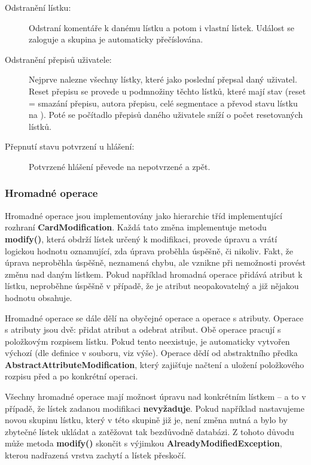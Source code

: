 \begin{description}
\item[Odstranění lístku:]{Odstraní komentáře k danému lístku a potom i vlastní lístek. Událost se zaloguje a skupina je automaticky přečíslována.}
\item[Odstranění přepisů uživatele:]{Nejprve nalezne všechny lístky, které jako poslední přepsal daný uživatel. Reset přepisu se provede u podmnožiny těchto lístků, které mají stav  (reset = smazání přepisu, autora přepisu, celé segmentace a převod stavu lístku na ). Poté se počítadlo přepisů daného uživatele sníží o počet resetovaných lístků.}
\item[Přepnutí stavu potvrzení u hlášení:]{Potvrzené hlášení převede na nepotvrzené a zpět.}
\end{description} 

\subsubsection{Hromadné operace}

Hromadné operace jsou implementovány jako hierarchie tříd implementující rozhraní {\bf CardModification}. Každá tato změna implementuje metodu {\bf modify()}, která obdrží lístek určený k modifikaci, provede úpravu a vrátí logickou hodnotu oznamující, zda úprava proběhla úspěšně, či nikoliv. Fakt, že úprava neproběhla úspěšně, neznamená chybu, ale vznikne při nemožnosti provést změnu nad daným lístkem. Pokud například hromadná operace přidává atribut k lístku, neproběhne úspěšně v případě, že je atribut neopakovatelný a již nějakou hodnotu obsahuje. 

Hromadné operace se dále dělí na obyčejné operace a operace s atributy. Operace s atributy jsou dvě: přidat atribut a odebrat atribut. Obě operace pracují s položkovým rozpisem lístku. Pokud tento neexistuje, je automaticky vytvořen výchozí (dle definice v souboru, viz výše). Operace dědí od abstraktního předka {\bf AbstractAttributeModification}, který zajišťuje načtení a uložení položkového rozpisu před a po konkrétní operaci. 

Všechny hromadné operace mají možnost  úpravu nad konkrétním lístkem -- a to v případě, že lístek zadanou modifikaci {\bf nevyžaduje}. Pokud například nastavujeme novou skupinu lístku, který v této skupině již je, není změna nutná a bylo by zbytečné lístek ukládat a zatěžovat tak bezdůvodně databázi. Z tohoto důvodu může metoda {\bf modify()} skončit s výjimkou {\bf AlreadyModifiedException}, kterou nadřazená vrstva zachytí a lístek přeskočí.

